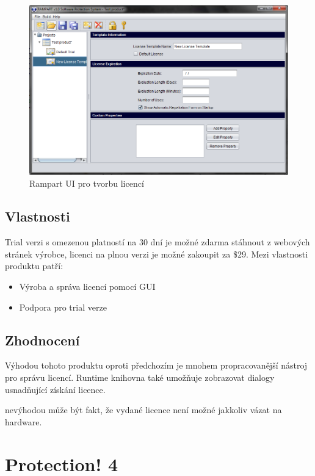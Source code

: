 \begin{figure}[H]
\begin{center}
\includegraphics[width=16cm]{figures/rampart.PNG}
\caption{Rampart UI pro tvorbu licencí}
\label{fig:rampart-ui} 
\end{center}
\end{figure}

\subsection*{Vlastnosti}
Trial verzi s omezenou platností na 30 dní je možné zdarma stáhnout z webových
stránek výrobce, licenci na plnou verzi je možné zakoupit za \$29. Mezi
vlastnosti produktu patří:

\begin{itemize}
  \item Výroba a správa licencí pomocí GUI
  \item Podpora pro trial verze
\end{itemize}

\subsection*{Zhodnocení}
Výhodou tohoto produktu oproti předchozím je mnohem propracovanější nástroj pro
správu licencí. Runtime knihovna také umožňuje zobrazovat dialogy usnadňující
získání licence.

nevýhodou může být fakt, že vydané licence není možné jakkoliv vázat na
hardware.

\section{Protection! 4}

